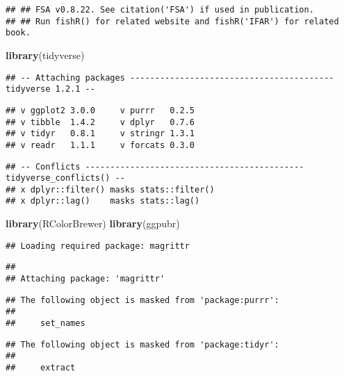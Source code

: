 \documentclass[]{article}
\newenvironment{Shaded}{\begin{snugshade}}{\end{snugshade}}
\newcommand{\KeywordTok}[1]{\textcolor[rgb]{0.13,0.29,0.53}{\textbf{#1}}}
\newcommand{\NormalTok}[1]{#1}
\begin{document}
\begin{verbatim}
## ## FSA v0.8.22. See citation('FSA') if used in publication.
## ## Run fishR() for related website and fishR('IFAR') for related book.
\end{verbatim}

\begin{Shaded}
\begin{Highlighting}[]
\KeywordTok{library}\NormalTok{(tidyverse)}
\end{Highlighting}
\end{Shaded}

\begin{verbatim}
## -- Attaching packages ----------------------------------------- tidyverse 1.2.1 --
\end{verbatim}

\begin{verbatim}
## v ggplot2 3.0.0     v purrr   0.2.5
## v tibble  1.4.2     v dplyr   0.7.6
## v tidyr   0.8.1     v stringr 1.3.1
## v readr   1.1.1     v forcats 0.3.0
\end{verbatim}

\begin{verbatim}
## -- Conflicts -------------------------------------------- tidyverse_conflicts() --
## x dplyr::filter() masks stats::filter()
## x dplyr::lag()    masks stats::lag()
\end{verbatim}

\begin{Shaded}
\begin{Highlighting}[]
\KeywordTok{library}\NormalTok{(RColorBrewer)}
\KeywordTok{library}\NormalTok{(ggpubr)}
\end{Highlighting}
\end{Shaded}

\begin{verbatim}
## Loading required package: magrittr
\end{verbatim}

\begin{verbatim}
## 
## Attaching package: 'magrittr'
\end{verbatim}

\begin{verbatim}
## The following object is masked from 'package:purrr':
## 
##     set_names
\end{verbatim}

\begin{verbatim}
## The following object is masked from 'package:tidyr':
## 
##     extract
\end{verbatim}
\end{document}
